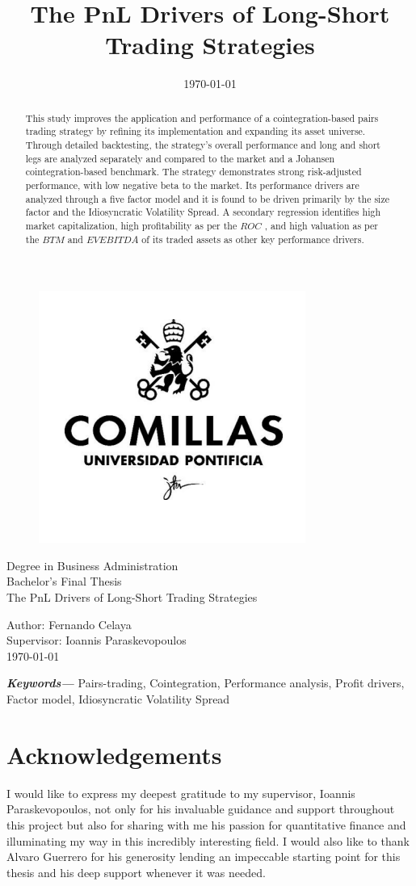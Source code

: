 \documentclass[12pt,a4paper,twoside]{article}
\title{The PnL Drivers of Long-Short Trading Strategies}
\date{\today}
\providecommand{\keywords}[1]
{
  \small	
  \textbf{\textit{Keywords---}} #1
}
\begin{document}
\pagestyle{empty}
\begin{titlepage}
  \begin{figure}
    \centering
    \includegraphics[width=0.3\linewidth]{assets/logo-comillas.png}
  \end{figure}
  \centering
  \Large 
  Degree in Business Administration \\ Bachelor's Final Thesis\\[36px]
  \Huge 
  The PnL Drivers of Long-Short Trading Strategies\\
  \Large
  \raggedright
  \vspace*{\fill}
  Author: Fernando Celaya\\
  Supervisor: Ioannis Paraskevopoulos\\
  \today

\end{titlepage}
\newpage

\begin{abstract}
  This study improves the application and performance of a cointegration-based pairs trading strategy by refining its implementation and expanding its asset universe. Through detailed backtesting, the strategy's overall performance and long and short legs are analyzed separately and compared to the market and a Johansen cointegration-based benchmark. The strategy demonstrates strong risk-adjusted performance, with low negative beta to the market. Its performance drivers are analyzed through a five factor model and it is found to be driven primarily by the size factor and the Idiosyncratic Volatility Spread. A secondary regression identifies high market capitalization, high profitability as per the $ROC$ , and high valuation as per the $BTM$ and $EVEBITDA$ of its traded assets as other key performance drivers. 
\end{abstract}
\keywords{Pairs-trading, Cointegration, Performance analysis, Profit drivers, Factor model, Idiosyncratic Volatility Spread}
\newpage

\section*{Acknowledgements}
I would like to express my deepest gratitude to my supervisor, Ioannis Paraskevopoulos, not only for his invaluable guidance and support throughout this project but also for sharing with me his passion for quantitative finance and illuminating my way in this incredibly interesting field. I would also like to thank Alvaro Guerrero for his generosity lending an impeccable starting point for this thesis and his deep support whenever it was needed. 
\newpage
\end{document}
